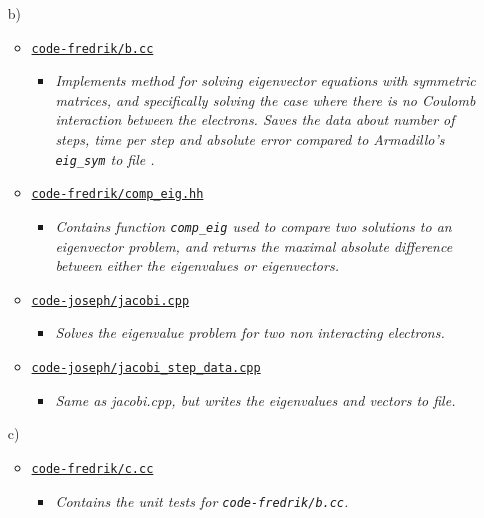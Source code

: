\documentclass[11pt,a4paper]{article}
\begin{document}
\begin{enumerate}
  \item[b)]
  \begin{itemize}
    \item \href{https://github.com/frxstrem/fys3150/tree/master/project2/code-fredrik/b.cc}{\tt code-fredrik/b.cc}
    \begin{itemize}
      \item {\it Implements method for solving eigenvector equations with symmetric matrices, and specifically solving the case where there is no Coulomb interaction between the electrons. Saves the data about number of steps, time per step and absolute error compared to Armadillo's \texttt{eig\_sym} to file .}
    \end{itemize}
    \item \href{https://github.com/frxstrem/fys3150/tree/master/project2/code-fredrik/comp_eig.hh}{\tt code-fredrik/comp\_eig.hh}
    \begin{itemize}
      \item {\it Contains function \texttt{comp\_eig} used to compare two solutions to an eigenvector problem, and returns the maximal absolute difference between either the eigenvalues or eigenvectors.}
    \end{itemize}
    \item \href{https://github.com/frxstrem/fys3150/tree/master/project2/code-joseph/jacobi.cpp}{\tt code-joseph/jacobi.cpp}
    \begin{itemize}
      \item {\it Solves the eigenvalue problem for two non interacting electrons.}
    \end{itemize}
    \item \href{https://github.com/frxstrem/fys3150/tree/master/project2/code-joseph/jacobi_step_data.cpp}{\tt code-joseph/jacobi\_step\_data.cpp}
    \begin{itemize}
      \item {\it Same as jacobi.cpp, but writes the eigenvalues and vectors to file.}
    \end{itemize}
  \end{itemize}

  \item[c)]
  \begin{itemize}
  \item \href{https://github.com/frxstrem/fys3150/tree/master/project2/code-fredrik/c.cc}{\tt code-fredrik/c.cc}
  \begin{itemize}
    \item {\it Contains the unit tests for \texttt{code-fredrik/b.cc}.}
  \end{itemize}
  \end{itemize}


\end{enumerate}
\end{document}
